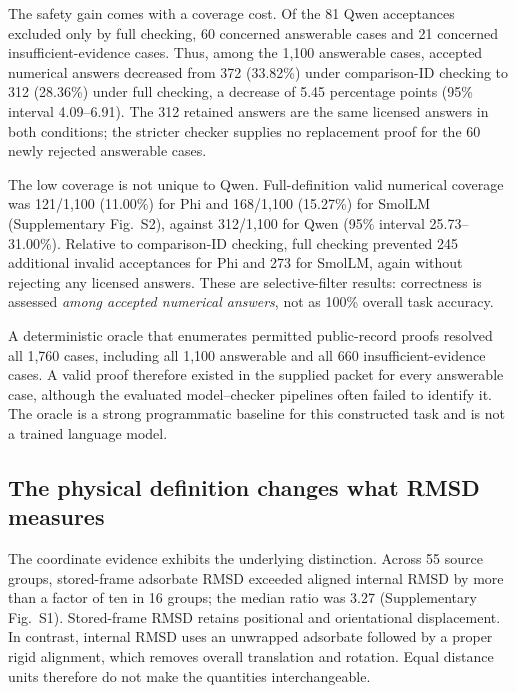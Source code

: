 The safety gain comes with a coverage cost. Of the 81 Qwen acceptances excluded only by full checking, 60 concerned answerable cases and 21 concerned insufficient-evidence cases. Thus, among the 1,100 answerable cases, accepted numerical answers decreased from 372 (33.82\%) under comparison-ID checking to 312 (28.36\%) under full checking, a decrease of 5.45 percentage points (95\% interval 4.09--6.91). The 312 retained answers are the same licensed answers in both conditions; the stricter checker supplies no replacement proof for the 60 newly rejected answerable cases.

The low coverage is not unique to Qwen. Full-definition valid numerical coverage was 121/1,100 (11.00\%) for Phi and 168/1,100 (15.27\%) for SmolLM (Supplementary Fig.~S2), against 312/1,100 for Qwen (95\% interval 25.73--31.00\%). Relative to comparison-ID checking, full checking prevented 245 additional invalid acceptances for Phi and 273 for SmolLM, again without rejecting any licensed answers. These are selective-filter results: correctness is assessed \emph{among accepted numerical answers}, not as 100\% overall task accuracy.

A deterministic oracle that enumerates permitted public-record proofs resolved all 1,760 cases, including all 1,100 answerable and all 660 insufficient-evidence cases. A valid proof therefore existed in the supplied packet for every answerable case, although the evaluated model--checker pipelines often failed to identify it. The oracle is a strong programmatic baseline for this constructed task and is not a trained language model.



\subsection{The physical definition changes what RMSD measures}
\label{sec:physical_results}

The coordinate evidence exhibits the underlying distinction. Across 55 source groups, stored-frame adsorbate RMSD exceeded aligned internal RMSD by more than a factor of ten in 16 groups; the median ratio was 3.27 (Supplementary Fig.~S1). Stored-frame RMSD retains positional and orientational displacement. In contrast, internal RMSD uses an unwrapped adsorbate followed by a proper rigid alignment, which removes overall translation and rotation.\cite{kabsch1978discussion} Equal distance units therefore do not make the quantities interchangeable.

